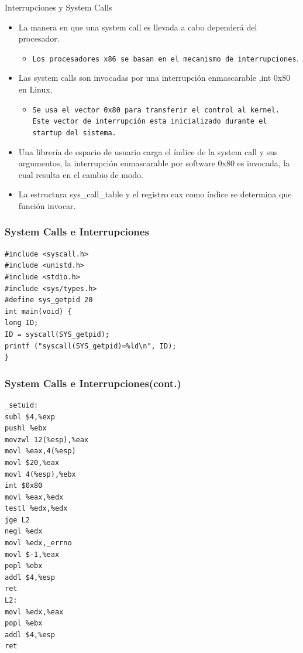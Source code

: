 \begin{frame}{Interrupciones y System Calls}
  \begin{itemize}
    \item La manera en que una system call es llevada a cabo dependerá del procesador.
      \begin{itemize}
	    \item \texttt{Los procesadores x86 se basan en el mecanismo de interrupciones}.
	\end{itemize}  
    
   \item Las system calls son invocadas por una interrupción enmascarable ,int 0x80 en Linux.
   \begin{itemize}  
   \item \texttt{Se usa el vector 0x80 para transferir el control al kernel. Este vector de interrupción esta inicializado durante el startup del sistema.}
 \end{itemize}
    \item Una librería de espacio de usuario carga el índice de la system call y sus argumentos, la interrupción enmascarable por software 	0x80 es invocada, la cual resulta en el cambio de modo.	
   \item La estructura sys\_call\_table y el registro eax como índice se determina que función invocar.	
  \end{itemize}
\end{frame}

\begin{frame}[fragile]
\frametitle{System Calls e Interrupciones}
\begin{lstlisting}
#include <syscall.h>
#include <unistd.h>
#include <stdio.h>
#include <sys/types.h>
#define sys_getpid 20
int main(void) {
long ID;
ID = syscall(SYS_getpid);
printf ("syscall(SYS_getpid)=%ld\n", ID);
}
\end{lstlisting}
\end{frame}

\begin{frame}[fragile]
\frametitle{System Calls e Interrupciones(cont.)}
\begin{lstlisting}
_setuid:
subl $4,%exp
pushl %ebx
movzwl 12(%esp),%eax
movl %eax,4(%esp)
movl $20,%eax
movl 4(%esp),%ebx
int $0x80
movl %eax,%edx
testl %edx,%edx
jge L2
negl %edx
movl %edx,_errno
movl $-1,%eax
popl %ebx
addl $4,%esp
ret
L2:
movl %edx,%eax
popl %ebx
addl $4,%esp
ret

\end{lstlisting}
\end{frame}

